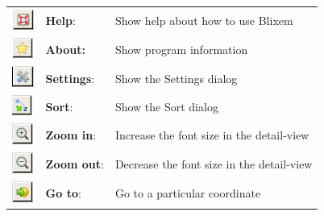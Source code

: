 \documentclass[letterpaper]{article}
\begin{document}
\begin{center}
\tablehead{}
\begin{supertabular}{b{1.5cm}p{4.373cm}p{8.967cm}}
 
\includegraphics[width=0.713cm,height=0.7cm]{img_button_help.png} &
\textbf{Help}:  &
Show help about how to use Blixem\\
 
\includegraphics[width=0.73cm,height=0.663cm]{img_button_about.png} &
\textbf{About:} &
Show program information\\
 
\includegraphics[width=0.702cm,height=0.702cm]{img_button_settings.png} &
\textbf{Settings}:  &
Show the Settings dialog\\
 
\includegraphics[width=0.661cm,height=0.653cm]{img_button_sort.png} &
\textbf{Sort}:  &
Show the Sort dialog\\
 
\includegraphics[width=0.693cm,height=0.693cm]{img_button_zoom_in.png} &
\textbf{Zoom in}:  &
Increase the font size in the detail-view\\
 
\includegraphics[width=0.693cm,height=0.693cm]{img_button_zoom_out.png} &
\textbf{Zoom out}:  &
Decrease the font size in the detail-view\\
 
\includegraphics[width=0.693cm,height=0.693cm]{img_button_go_to.png} &
\textbf{Go to}: &
Go to a particular coordinate\\
 

\end{supertabular}
\end{center}
\end{document}
